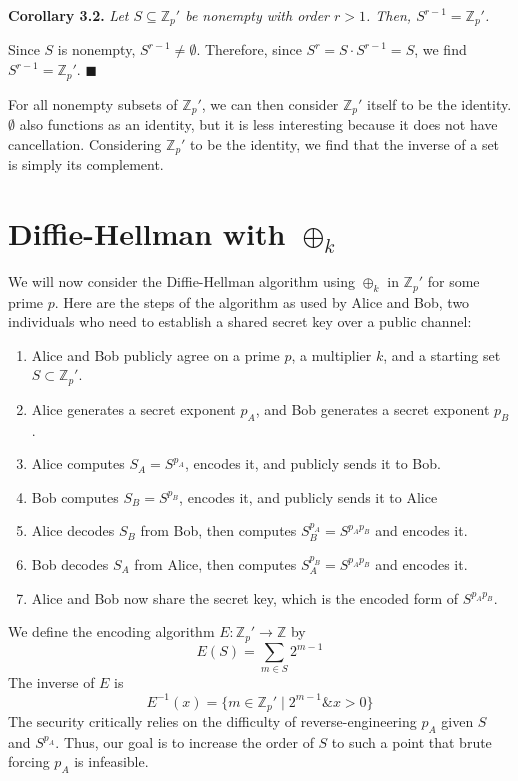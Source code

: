 \documentclass{article}
\newcommand{\zee}{\mathbb{Z}}
\begin{document}
\textbf{Corollary 3.2.} \textit{Let $S \subseteq \zee_p'$
be nonempty with order $r > 1$. Then, $S^{r-1} = \zee_p'$.}

Since $S$ is nonempty, $S^{r-1} \neq \emptyset$.
Therefore, since $S^r = S \cdot S^{r-1} = S$,
we find $S^{r-1} = \zee_p'$.
$\blacksquare$

For all nonempty subsets of $\zee_p'$, we can then consider
$\zee_p'$ itself to be the identity. $\emptyset$ also functions
as an identity, but it is less interesting because it does not have
cancellation. Considering $\zee_p'$ to be the identity,
we find that the inverse of a set is simply its complement.

\section{Diffie-Hellman with $\oplus_k$}

We will now consider the Diffie-Hellman algorithm using $\oplus_k$
in $\zee_p'$ for some prime $p$. Here are the steps of the algorithm
as used by Alice and Bob, two individuals who need to establish a
shared secret key over a public channel:
\begin{enumerate}
    \item Alice and Bob publicly agree on a prime $p$,
    a multiplier $k$, and a starting set $S \subset \zee_p'$.
    \item Alice generates a secret exponent $p_A$, and Bob
    generates a secret exponent $p_B$.
    \item Alice computes $S_A = S^{p_A}$, encodes it,
    and publicly sends it to Bob.
    \item Bob computes $S_B = S^{p_B}$, encodes it,
    and publicly sends it to Alice
    \item Alice decodes $S_B$ from Bob,
    then computes $S_B^{p_A} = S^{p_Ap_B}$ and encodes it.
    \item Bob decodes $S_A$ from Alice,
    then computes $S_A^{p_B} = S^{p_Ap_B}$ and encodes it.
    \item Alice and Bob now share the secret key,
    which is the encoded form of $S^{p_Ap_B}$.
\end{enumerate}

We define the encoding algorithm $E: \zee_p' \rightarrow \zee$
by
\[E(S) = \sum_{m \in S} 2^{m-1}\]
The inverse of $E$ is
\[E^{-1}(x) = \{m \in \zee_p' \mid 2^{m-1} \mathbin{\&} x > 0\}\]
The security critically relies on the difficulty of reverse-engineering
$p_A$ given $S$ and $S^{p_A}$. Thus, our goal is to increase the
order of $S$ to such a point that brute forcing $p_A$ is infeasible.
\end{document}
